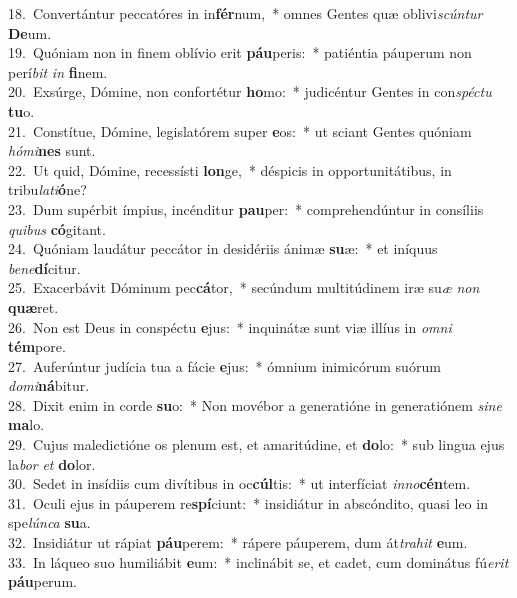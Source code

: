 {18.~}Convertántur peccatóres in in\textbf{fér}num,~* omnes Gentes quæ oblivi\textit{scún}\textit{tur} \textbf{De}um.\\
{19.~}Quóniam non in finem oblívio erit \textbf{páu}peris:~* patiéntia páuperum non perí\textit{bit} \textit{in} \textbf{fi}nem.\\
{20.~}Exsúrge, Dómine, non confortétur \textbf{ho}mo:~* judicéntur Gentes in con\textit{spé}\textit{ctu} \textbf{tu}o.\\
{21.~}Constítue, Dómine, legislatórem super \textbf{e}os:~* ut sciant Gentes quóniam \textit{hó}\textit{mi}\textbf{nes} sunt.\\
{22.~}Ut quid, Dómine, recessísti \textbf{lon}ge,~* déspicis in opportunitátibus, in tribu\textit{la}\textit{ti}\textbf{ó}ne?\\
{23.~}Dum supérbit ímpius, incénditur \textbf{pau}per:~* comprehendúntur in consíliis \textit{qui}\textit{bus} \textbf{có}gitant.\\
{24.~}Quóniam laudátur peccátor in desidériis ánimæ \textbf{su}æ:~* et iníquus \textit{be}\textit{ne}\textbf{dí}citur.\\
{25.~}Exacerbávit Dóminum pec\textbf{cá}tor,~* secúndum multitúdinem iræ su\textit{æ} \textit{non} \textbf{quæ}ret.\\
{26.~}Non est Deus in conspéctu \textbf{e}jus:~* inquinátæ sunt viæ illíus in \textit{om}\textit{ni} \textbf{tém}pore.\\
{27.~}Auferúntur judícia tua a fácie \textbf{e}jus:~* ómnium inimicórum suórum \textit{do}\textit{mi}\textbf{ná}bitur.\\
{28.~}Dixit enim in corde \textbf{su}o:~* Non movébor a generatióne in generatiónem \textit{si}\textit{ne} \textbf{ma}lo.\\
{29.~}Cujus maledictióne os plenum est, et amaritúdine, et \textbf{do}lo:~* sub lingua ejus la\textit{bor} \textit{et} \textbf{do}lor.\\
{30.~}Sedet in insídiis cum divítibus in oc\textbf{cúl}tis:~* ut interfíciat \textit{in}\textit{no}\textbf{cén}tem.\\
{31.~}Oculi ejus in páuperem re\textbf{spí}ciunt:~* insidiátur in abscóndito, quasi leo in spe\textit{lún}\textit{ca} \textbf{su}a.\\
{32.~}Insidiátur ut rápiat \textbf{páu}perem:~* rápere páuperem, dum át\textit{tra}\textit{hit} \textbf{e}um.\\
{33.~}In láqueo suo humiliábit \textbf{e}um:~* inclinábit se, et cadet, cum dominátus fú\textit{e}\textit{rit} \textbf{páu}perum.\\
